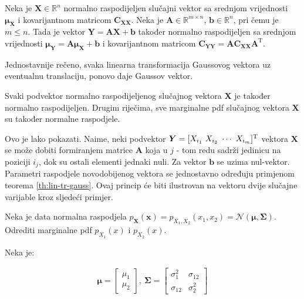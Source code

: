 \begin{theorem}
	\label{th:lin-tr-gauss}
	Neka je $\bm X \in \mathbb{R}^n$ normalno raspodijeljen slučajni vektor sa
	srednjom vrijednosti $\bm\mu_{\bm X}$ i kovarijantnom matricom $\bm C_{\bm
	X\bm X}$. Neka je $\bm A \in \mathbb{R}^{m\times n}$, $\bm b \in
	\mathbb{R}^n$, pri čemu je $m\le n$. Tada je vektor $\bm Y = \bm A \bm X + \bm
	b$ također normalno raspodijeljen sa srednjom vrijednosti $\bm\mu_{\bm Y} =
	\bm A\bm\mu_{\bm X} + \bm b$ i kovarijantnom matricom $\bm C_{\bm Y\bm Y} =
	\bm A \bm C_{\bm X\bm X} \bm A^\mathrm T$.

\end{theorem}

Jednostavnije rečeno, svaka linearna transformacija Gaussovog vektora uz
eventualnu translaciju, ponovo daje Gaussov vektor.

\begin{corollary}
	Svaki podvektor normalno raspodijeljenog slučajnog vektora $\bm X$ je također
	normalno raspodijeljen. Drugim riječima, sve marginalne pdf slučajnog
	vektora $\bm X$ su također normalne raspodjele.
\end{corollary}

Ovo je lako pokazati. Naime, neki podvektor $\bm Y = [X_{i_1}\ X_{i_2}\ \cdots\
X_{i_m}]^\text T$ vektora $\bm X$ se može dobiti formiranjem matrice $\bm A$
koja u $j$ - tom redu sadrži jedinicu na poziciji $i_j$, dok su ostali elementi
jednaki nuli. Za vektor $\bm b$ se uzima nul-vektor.  Parametri raspodjele
novodobijenog vektora se jednostavno određuju primjenom teorema
\ref{th:lin-tr-gauss}. Ovaj princip će biti ilustrovan na vektoru dvije slučajne
varijable kroz sljedeći primjer.

\begin{exmp}
	Neka je data normalna raspodjela $p_{\bm X}(\bm x) = p_{X_1,X_2}(x_1, x_2) =
	\mathcal{N}(\bm\mu, \bm \Sigma)$. Odrediti marginalne pdf $p_{X_1}(x)$ i
	$p_{X_2}(x)$.
\end{exmp}

Neka je:

\begin{eqnarray} \label{eq:kovarijansa-2d}
	\bm\mu = \left[\begin{array}{c}
		\mu_1 \\ \mu_2
	\end{array}\right],\ 
	\bm\Sigma = \left[\begin{array}{cc}
	  \sigma_1^2 & \sigma_{12} \\ \sigma_{12} & \sigma_2^2
	\end{array}\right]
\end{eqnarray}

